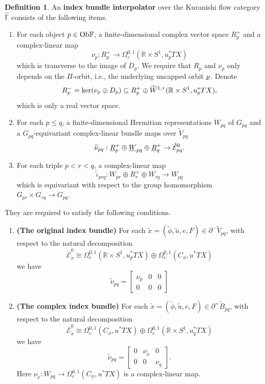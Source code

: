 \documentclass[reqno, 10pt]{amsart}
\numberwithin{equation}{section}
\numberwithin{equation}{section}
\renewcommand{\subset}{\subseteq}
\theoremstyle{definition}
\newtheorem{defn}[thm]{Definition}
\theoremstyle{remark}
\newcommand{\beqn}{\begin{equation*}}
\newcommand{\eeqn}{\end{equation*}}
\newcommand{\mb}{\mathbb}
\newcommand{\mc}{\mathcal}
\newcommand{\wt}{\widetilde}
\newcommand{\uds}[1]{\underline{\smash{#1}}}
\begin{document}
\begin{defn}\label{defn_bundle_interpolator}
An {\bf index bundle interpolator} over the Kuranishi flow category $\hat {\mb F}$ consists of the following items.
\begin{enumerate}

\item For each object $p \in {\rm Ob}{\mb F}$, a finite-dimensional complex vector space $R_p^+$ and a complex-linear map
\beqn
\nu_p: R_p^+ \to \Omega_c^{0,1} ({\mb R}\times S^1, u_p^* TX)
\eeqn
which is transverse to the image of $D_p$. We require that $R_p$ and $\nu_p$ only depends on the $\Pi$-orbit, i.e., the underlying uncapped orbit $\uds p$. Denote
\beqn
R_p^- = {\rm ker} (\nu_p \oplus D_p) \subset R_p^+ \oplus  \wt W^{1,\tau}({\mb R}\times S^1, u_p^* TX),
\eeqn
which is only a real vector space.

\item For each $p \leq q$, a finite-dimensional Hermitian representations $W_{pq}$ of $G_{pq}$ and a $G_{pq}$-equivariant complex-linear bundle maps over $\wt V_{pq}$
\beqn
\wt\nu_{pq}: \uds R_p^+ \oplus \uds W_{pq} \oplus \uds R_q^+ \to \mathring {\mc E}_{pq}^0.
\eeqn

\item For each triple $p < r < q$, a complex-linear map
\beqn
\wt\iota_{prq}: W_{pr} \oplus R_r^+ \oplus W_{rq} \to W_{pq}
\eeqn
which is equivariant with respect to the group homomorphism $G_{pr}\times G_{rq} \to G_{pq}$.
\end{enumerate}
They are required to satisfy the following conditions.
\begin{enumerate}
    \item {\bf (The original index bundle)} For each $\wt x  = (\wt \phi, \wt u, e, F) \in \partial^- \wt V_{pq}$, with respect to the natural decomposition
    \beqn
    \mathring {\mc E}_{\wt x}^0 \cong \Omega^{0,1}_c({\mb R}\times S^1, u_p^* TX) \oplus \Omega^{0,1}_c(C_\phi, u^* TX)
    \eeqn
    we have
    \beqn
    \wt\nu_{pq} = \left[ \begin{array}{ccc}  \nu_p & 0 & 0  \\  0 &  0  & 0 \end{array}\right]
    \eeqn

    \item {\bf (The complex index bundle)} For each $\wt x  = (\wt \phi, \wt u, e, F) \in \partial^+ \wt B_{pq}$, with respect to the natural decomposition
    \beqn
    \mathring {\mc E}_{\wt x}^0 \cong 
    \Omega_c^{0,1}( C_\phi, u^* TX) \oplus \Omega_c^{0,1}({\mb R}\times S^1, u_q^* TX)
    \eeqn
    we have
    \beqn
    \wt\nu_{pq} = \left[ \begin{array}{ccc} 0  &  \nu_{\wt x} &  0 \\
          0 & 0 & \nu_q \end{array}\right].
    \eeqn
    Here $\nu_{\wt x}: W_{pq} \to \Omega_c^{0,1}(C_\phi, u^* TX)$ is a complex-linear map.



\end{enumerate}
\end{defn}
\end{document}
